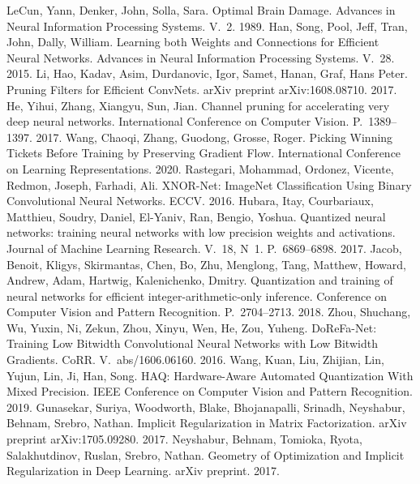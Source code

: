  LeCun, Yann, Denker, John, Solla, Sara. Optimal Brain Damage. Advances in Neural Information Processing Systems. V.~2. 1989.
 Han, Song, Pool, Jeff, Tran, John, Dally, William. Learning both Weights and Connections for Efficient Neural Networks. Advances in Neural Information Processing Systems. V.~28. 2015.
 Li, Hao, Kadav, Asim, Durdanovic, Igor, Samet, Hanan, Graf, Hans Peter. Pruning Filters for Efficient ConvNets. arXiv preprint arXiv:1608.08710. 2017.
 He, Yihui, Zhang, Xiangyu, Sun, Jian. Channel pruning for accelerating very deep neural networks. International Conference on Computer Vision. P.~1389--1397. 2017.
 Wang, Chaoqi, Zhang, Guodong, Grosse, Roger. Picking Winning Tickets Before Training by Preserving Gradient Flow. International Conference on Learning Representations. 2020.
 Rastegari, Mohammad, Ordonez, Vicente, Redmon, Joseph, Farhadi, Ali. XNOR-Net: ImageNet Classification Using Binary Convolutional Neural Networks. ECCV. 2016.
 Hubara, Itay, Courbariaux, Matthieu, Soudry, Daniel, El-Yaniv, Ran, Bengio, Yoshua. Quantized neural networks: training neural networks with low precision weights and activations. Journal of Machine Learning Research. V.~18, N~1. P.~6869--6898. 2017.
 Jacob, Benoit, Kligys, Skirmantas, Chen, Bo, Zhu, Menglong, Tang, Matthew, Howard, Andrew, Adam, Hartwig, Kalenichenko, Dmitry. Quantization and training of neural networks for efficient integer-arithmetic-only inference. Conference on Computer Vision and Pattern Recognition. P.~2704--2713. 2018.
 Zhou, Shuchang, Wu, Yuxin, Ni, Zekun, Zhou, Xinyu, Wen, He, Zou, Yuheng. DoReFa-Net: Training Low Bitwidth Convolutional Neural Networks with Low Bitwidth Gradients. CoRR. V.~abs/1606.06160. 2016.
 Wang, Kuan, Liu, Zhijian, Lin, Yujun, Lin, Ji, Han, Song. HAQ: Hardware-Aware Automated Quantization With Mixed Precision. IEEE Conference on Computer Vision and Pattern Recognition. 2019.
 Gunasekar, Suriya, Woodworth, Blake, Bhojanapalli, Srinadh, Neyshabur, Behnam, Srebro, Nathan. Implicit Regularization in Matrix Factorization. arXiv preprint arXiv:1705.09280. 2017.
 Neyshabur, Behnam, Tomioka, Ryota, Salakhutdinov, Ruslan, Srebro, Nathan. Geometry of Optimization and Implicit Regularization in Deep Learning. arXiv preprint. 2017.
